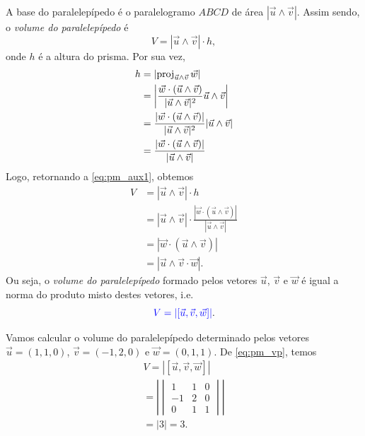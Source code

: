A base do paralelepípedo é o paralelogramo $ABCD$ de área $|\vec{u}\land\vec{v}|$. Assim sendo, o \emph{volume do paralelepípedo} é
\begin{equation}\label{eq:pm_aux1}
  V = |\vec{u}\land\vec{v}|\cdot h,
\end{equation}
onde $h$ é a altura do prisma. Por sua vez,
\begin{align}
  h &= \left|\operatorname{proj}_{\vec{u}\land\vec{v}}\vec{w}\right| \\
    &= \left|\frac{\vec{w}\cdot(\vec{u}\land\vec{v})}{|\vec{u}\land\vec{v}|^2}\vec{u}\land\vec{v}\right|\\
    &= \frac{\left|\vec{w}\cdot(\vec{u}\land\vec{v})\right|}{|\vec{u}\land\vec{v}|^2}|\vec{u}\land\vec{v}|\\
    &= \frac{\left|\vec{w}\cdot(\vec{u}\land\vec{v})\right|}{|\vec{u}\land\vec{v}|} 
\end{align}
Logo, retornando a \eqref{eq:pm_aux1}, obtemos
\begin{align}
  V &= |\vec{u}\land\vec{v}|\cdot h\\
    &= |\vec{u}\land\vec{v}|\cdot\frac{\left|\vec{w}\cdot(\vec{u}\land\vec{v})\right|}{|\vec{u}\land\vec{v}|} \\
    &= \left|\vec{w}\cdot(\vec{u}\land\vec{v})\right|\\
    &= \left|\vec{u}\land\vec{v}\cdot\vec{w}\right|.
\end{align}
Ou seja, o \emph{volume do paralelepípedo} formado pelos vetores $\vec{u}$, $\vec{v}$ e $\vec{w}$ é igual a norma do produto misto destes vetores, i.e.
\begin{equation}\label{eq:pm_vp}
  {\color{blue}V = |[\vec{u},\vec{v},\vec{w}]|}.
\end{equation}

\begin{ex}
  Vamos calcular o volume do paralelepípedo determinado pelos vetores $\vec{u}=(1,1,0)$, $\vec{v}=(-1,2,0)$ e $\vec{w}=(0,1,1)$. De \eqref{eq:pm_vp}, temos
  \begin{gather}
    V = |[\vec{u},\vec{v},\vec{w}]| \\
    = \left|
      \begin{vmatrix}
        1 & 1 & 0 \\
        -1 & 2 & 0 \\
        0 & 1 & 1
      \end{vmatrix}
    \right| \\
    = |3| = 3.
  \end{gather}
\end{ex}

